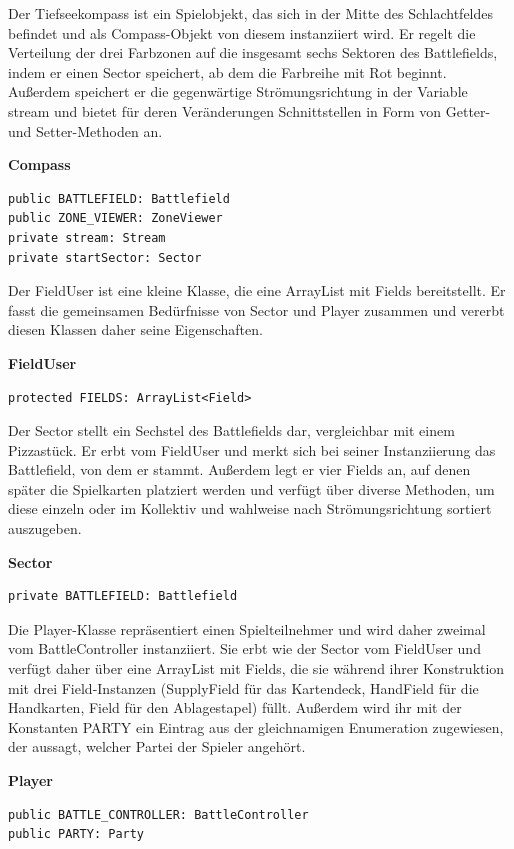 Der Tiefseekompass ist ein Spielobjekt, das sich in der Mitte des Schlachtfeldes befindet und als Compass-Objekt von diesem instanziiert wird. Er regelt die Verteilung der drei Farbzonen auf die insgesamt sechs Sektoren des Battlefields, indem er einen Sector speichert, ab dem die Farbreihe mit Rot beginnt. Außerdem speichert er die gegenwärtige Strömungsrichtung in der Variable stream und bietet für deren Veränderungen Schnittstellen in Form von Getter- und Setter-Methoden an.

\textbf{Compass}
\begin{lstlisting}[frame=single]
public BATTLEFIELD: Battlefield
public ZONE_VIEWER: ZoneViewer
private stream: Stream
private startSector: Sector
\end{lstlisting}

Der FieldUser ist eine kleine Klasse, die eine ArrayList mit Fields bereitstellt. Er fasst die gemeinsamen Bedürfnisse von Sector und Player zusammen und vererbt diesen Klassen daher seine Eigenschaften.

\textbf{FieldUser}
\begin{lstlisting}[frame=single]
protected FIELDS: ArrayList<Field>
\end{lstlisting}

Der Sector stellt ein Sechstel des Battlefields dar, vergleichbar mit einem Pizzastück. Er erbt vom FieldUser und merkt sich bei seiner Instanziierung das Battlefield, von dem er stammt. Außerdem legt er vier Fields an, auf denen später die Spielkarten platziert werden und verfügt über diverse Methoden, um diese einzeln oder im Kollektiv und wahlweise nach Strömungsrichtung sortiert auszugeben.

\textbf{Sector}
\begin{lstlisting}[frame=single]
private BATTLEFIELD: Battlefield
\end{lstlisting}

Die Player-Klasse repräsentiert einen Spielteilnehmer und wird daher zweimal vom BattleController instanziiert. Sie erbt wie der Sector vom FieldUser und verfügt daher über eine ArrayList mit Fields, die sie während ihrer Konstruktion mit drei Field-Instanzen (SupplyField für das Kartendeck, HandField für die Handkarten, Field für den Ablagestapel) füllt. Außerdem wird ihr   mit der Konstanten PARTY ein Eintrag aus der gleichnamigen Enumeration zugewiesen, der aussagt, welcher Partei der Spieler angehört.

\textbf{Player}
\begin{lstlisting}[frame=single]
public BATTLE_CONTROLLER: BattleController
public PARTY: Party
\end{lstlisting}

